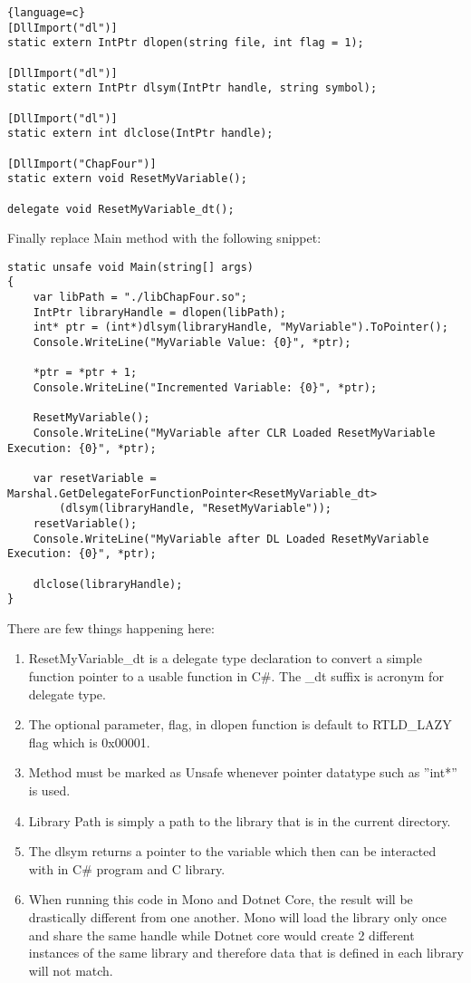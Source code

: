 \begin{lstlisting}{language=c}
[DllImport("dl")]
static extern IntPtr dlopen(string file, int flag = 1);

[DllImport("dl")]
static extern IntPtr dlsym(IntPtr handle, string symbol);

[DllImport("dl")]
static extern int dlclose(IntPtr handle);

[DllImport("ChapFour")]
static extern void ResetMyVariable();

delegate void ResetMyVariable_dt();
\end{lstlisting}

Finally replace Main method with the following snippet:

\begin{lstlisting}
static unsafe void Main(string[] args)
{
	var libPath = "./libChapFour.so";
	IntPtr libraryHandle = dlopen(libPath);
	int* ptr = (int*)dlsym(libraryHandle, "MyVariable").ToPointer();
	Console.WriteLine("MyVariable Value: {0}", *ptr);
	
	*ptr = *ptr + 1;
	Console.WriteLine("Incremented Variable: {0}", *ptr);
	
	ResetMyVariable();
	Console.WriteLine("MyVariable after CLR Loaded ResetMyVariable Execution: {0}", *ptr);
	
	var resetVariable = Marshal.GetDelegateForFunctionPointer<ResetMyVariable_dt>
		(dlsym(libraryHandle, "ResetMyVariable"));
	resetVariable();
	Console.WriteLine("MyVariable after DL Loaded ResetMyVariable Execution: {0}", *ptr);
	
	dlclose(libraryHandle);
}

\end{lstlisting}
\newpage
There are few things happening here:

\begin{enumerate}
	\item ResetMyVariable\_dt is a delegate type declaration to convert a simple function pointer to a usable function in C\#. The \_dt suffix is acronym for delegate type.
	\item The optional parameter, flag, in dlopen function is default to RTLD\_LAZY flag which is 0x00001.
	\item Method must be marked as Unsafe whenever pointer datatype such as ''int*'' is used.
	\item Library Path is simply a path to the library that is in the current directory.
	\item The dlsym returns a pointer to the variable which then can be interacted with in C\# program and C library.
	\item When running this code in Mono and Dotnet Core, the result will be drastically different from one another. Mono will load the library only once and share the same handle while Dotnet core would create 2 different instances of the same library and therefore data that is defined in each library will not match.
\end{enumerate}

